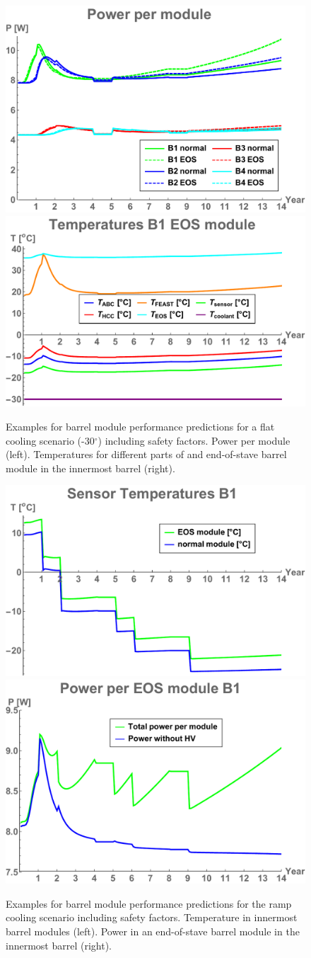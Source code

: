\begin{figure}[ht]
\centering
\includegraphics[width=0.4\linewidth]{figures/powerpermodule.pdf}\quad\quad
\includegraphics[width=0.4\linewidth]{figures/Teosmodule.pdf}
\caption{Examples for barrel module performance predictions for a flat cooling scenario (-30$^\circ$) including safety factors. Power per module (left). Temperatures for different parts of and end-of-stave barrel module in the innermost barrel (right).}
\label{fig:moduleflatperformance}
\end{figure}

\begin{figure}[ht]
\centering
\includegraphics[width=0.4\linewidth]{figures/Tmodule.pdf}\quad\quad
\includegraphics[width=0.4\linewidth]{figures/Peosmodule.pdf}
\caption{Examples for barrel module performance predictions for the ramp cooling scenario including safety factors. Temperature in innermost barrel modules (left). Power in an end-of-stave barrel module in the innermost barrel (right).}
\label{fig:modulerampperformance}
\end{figure}

